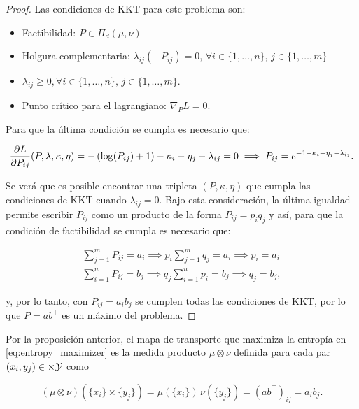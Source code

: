 \begin{proof}
	Las condiciones de KKT para este problema son:

	\begin{itemize}
		\item Factibilidad: $P \in\Pi_d(\mu,\nu)$
		\item Holgura complementaria: $\lambda_{ij}(-P_{ij})=0,\, \forall i\in\{1,\ldots,n\},\, j\in\{1,\ldots,m\}$
		\item $\lambda_{ij}\geq 0, \forall i\in\{1,\ldots,n\},\, j\in\{1,\ldots,m\}$.
		\item Punto crítico para el lagrangiano: $\nabla_P L = 0$.
	\end{itemize}

	Para que la última condición se cumpla es necesario que:

	\begin{equation*}
		\frac{\partial L}{\partial P_{ij}}(P,\lambda,\kappa,\eta) = -\left(\log(P_{ij})+1\right) - \kappa_i - \eta_j - \lambda_{ij} = 0 \implies P_{ij} = e^{-1 - \kappa_i - \eta_j - \lambda_{ij}}.
	\end{equation*}

	Se verá que es posible encontrar una tripleta $(P,\kappa,\eta)$ que cumpla las condiciones de KKT cuando $\lambda_{ij}=0$. Bajo esta consideración, la última igualdad permite escribir $P_{ij}$ como un producto de la forma $P_{ij} = p_i q_j$ y así, para que la condición de factibilidad se cumpla es necesario que:

	\begin{align*}
		\sum_{j=1}^m P_{ij} = a_i \implies p_i \sum_{j=1}^m q_j = a_i \implies p_i = a_i \\
		\sum_{i=1}^n P_{ij} = b_j \implies q_j \sum_{i=1}^n p_i = b_j \implies q_j = b_j ,
	\end{align*}

	y, por lo tanto, con $P_{ij} = a_i b_j$ se cumplen todas las condiciones de KKT, por lo que $P=ab^\top$ es un máximo del problema.
\end{proof}

Por la proposición anterior, el mapa de transporte que maximiza la entropía en \eqref{eq:entropy_maximizer} es la medida producto $\mu\otimes\nu$ definida para cada par $(x_i,y_j)\in\times\mathcal{Y}$ como

\begin{equation*}
	(\mu\otimes\nu)(\{x_i\}\times\{y_j\}) = \mu(\{x_i\})\,\nu(\{y_j\}) = (ab^\top)_{ij} = a_i b_j .
\end{equation*}

